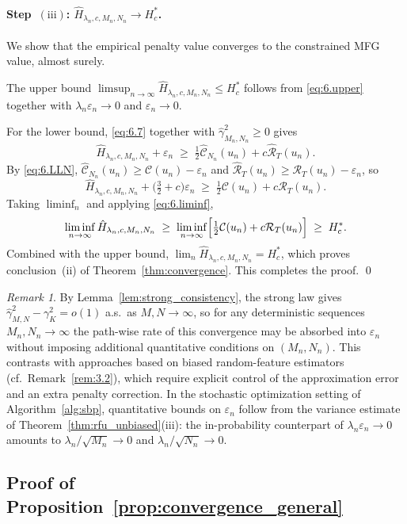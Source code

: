 \documentclass[11pt,leqno]{article}
\theoremstyle{plain}
\theoremstyle{remark}
\newtheorem{rem}[thm]{Remark}
\theoremstyle{definition}
\numberwithin{equation}{section}
\numberwithin{figure}{section}
\numberwithin{table}{section}
\numberwithin{algorithm}{section}
\begin{document}
\paragraph{Step~$(\mathrm{iii})$: $\hat{H}_{\lambda_n,c,M_n,N_n}\to H^*_c$.}
We show that the empirical penalty value converges to the constrained MFG value, almost surely.

The upper bound $\limsup_{n\to\infty}\hat{H}_{\lambda_n,c,M_n,N_n}\le H^*_c$ follows from \eqref{eq:6.upper}
together with $\lambda_n\varepsilon_n\to 0$ and $\varepsilon_n\to 0$.

For the lower bound, \eqref{eq:6.7} together with $\hat{\gamma}_{M_n,N_n}^2\ge 0$ gives
\[
 \hat{H}_{\lambda_n,c,M_n,N_n}+\varepsilon_n
 \;\ge\;\tfrac{1}{2}\hat{\mathcal{C}}_{N_n}(u_n)+c\hat{\mathcal{R}}_T(u_n).
\]
By \eqref{eq:6.LLN},
$\hat{\mathcal{C}}_{N_n}(u_n)\ge \mathcal{C}(u_n)-\varepsilon_n$ and $\hat{\mathcal{R}}_T(u_n)\ge \mathcal{R}_T(u_n)-\varepsilon_n$,
so
\[
 \hat{H}_{\lambda_n,c,M_n,N_n}+\bigl(\tfrac{3}{2}+c\bigr)\varepsilon_n
 \;\ge\;\tfrac{1}{2}\mathcal{C}(u_n)+c\mathcal{R}_T(u_n).
\]
Taking $\liminf_n$ and applying \eqref{eq:6.liminf},
\[
 \liminf_{n\to\infty}\hat{H}_{\lambda_n,c,M_n,N_n}
 \;\ge\;\liminf_{n\to\infty}\Bigl[\tfrac{1}{2}\mathcal{C}(u_n)+c\mathcal{R}_T(u_n)\Bigr]
 \;\ge\;H^*_c.
\]
Combined with the upper bound, $\lim_n\hat{H}_{\lambda_n,c,M_n,N_n}=H^*_c$,
which proves conclusion~(ii) of Theorem~\ref{thm:convergence}.
This completes the proof.
\qed


\begin{rem}\label{rem:6.3}
By Lemma~\ref{lem:strong_consistency}, the strong law gives
$\hat{\gamma}_{M,N}^2-\gamma_K^2 = o(1)$ a.s.\ as $M,N\to\infty$, so for any deterministic sequences
$M_n,N_n\to\infty$ the path-wise rate of this convergence may be absorbed into $\varepsilon_n$
without imposing additional quantitative conditions on $(M_n,N_n)$.
This contrasts with approaches based on biased random-feature estimators (cf.\ Remark~\ref{rem:3.2}),
which require explicit control of the approximation error and an extra penalty correction.
In the stochastic optimization setting of Algorithm~\ref{alg:sbp},
quantitative bounds on $\varepsilon_n$ follow from the variance estimate of Theorem~\ref{thm:rfu_unbiased}(iii):
the in-probability counterpart of $\lambda_n\varepsilon_n\to 0$ amounts to $\lambda_n/\sqrt{M_n}\to 0$ and $\lambda_n/\sqrt{N_n}\to 0$.
\end{rem}


\subsection{Proof of Proposition~\ref{prop:convergence_general}}\label{sec:6.2gen}
\end{document}
